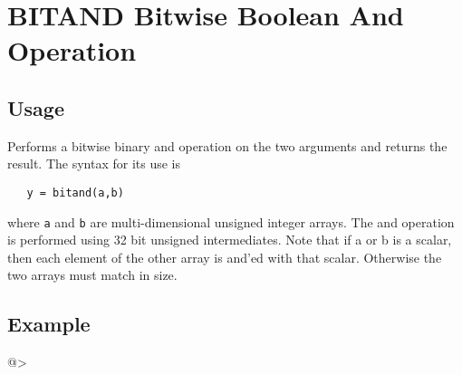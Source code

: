 \section{BITAND Bitwise Boolean And Operation}

\subsection{Usage}

Performs a bitwise binary and operation on the two arguments and
returns the result.  The syntax for its use is
\begin{verbatim}
   y = bitand(a,b)
\end{verbatim}
where \verb|a| and \verb|b| are multi-dimensional unsigned integer arrays.
The and operation is performed using 32 bit unsigned intermediates.  Note that if a
or b is a scalar, then each element of the other array is and'ed with
 that scalar.  Otherwise the two arrays must match in size.
\subsection{Example}

@>
